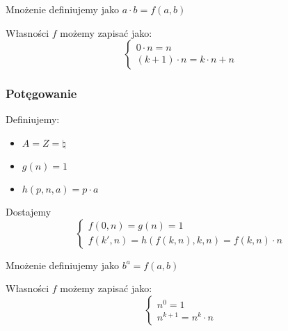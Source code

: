 Mnożenie definiujemy jako \( a \cdot b = f(a, b) \)

Własności \( f \) możemy zapisać jako:
\[
	\begin{cases}
		0 \cdot n = n \\
		(k + 1) \cdot n = k \cdot n + n
	\end{cases}
\]

\subsubsection{Potęgowanie}
Definiujemy:
\begin{itemize}
	\item \( A = Z = \natural \)
	\item \( g(n) = 1 \)
	\item \( h(p, n, a) = p \cdot a \)
\end{itemize}

Dostajemy
\[
	\begin{cases}
		f(0, n) = g(n) = 1 \\
		f(k', n) = h(f(k, n), k, n) = f(k, n) \cdot n
	\end{cases}
\]

Mnożenie definiujemy jako \( b^a = f(a, b) \)

Własności \( f \) możemy zapisać jako:
\[
	\begin{cases}
		n^0 = 1 \\
		n^{k + 1} = n^k \cdot n
	\end{cases}
\]
